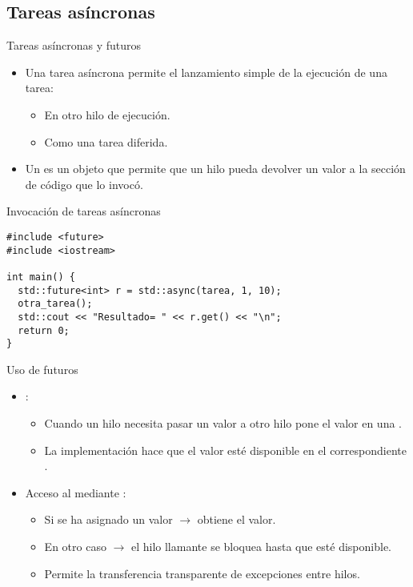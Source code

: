 \subsection{Tareas asíncronas}

\begin{frame}[t]{Tareas asíncronas y futuros}
\begin{itemize}
  \item Una tarea asíncrona permite el lanzamiento simple de la ejecución de una tarea:
    \begin{itemize}
      \item En otro hilo de ejecución.
      \item Como una tarea diferida.
    \end{itemize}

  \item Un  es un objeto que permite que un hilo pueda devolver un valor a la 
    sección de código que lo invocó.
\end{itemize}
\end{frame}

\begin{frame}[t,fragile]
\begin{block}{Invocación de tareas asíncronas}
\begin{lstlisting}
#include <future>
#include <iostream>

int main() {
  std::future<int> r = std::async(tarea, 1, 10);
  otra_tarea();
  std::cout << "Resultado= " << r.get() << "\n";
  return 0;
}
\end{lstlisting}
\end{block}
\end{frame}

\begin{frame}[t]{Uso de futuros}
\begin{itemize}
  \item {}:
    \begin{itemize}
      \item Cuando un hilo necesita pasar un valor a otro hilo pone el valor en una .
      \item La implementación hace que el valor esté disponible en el correspondiente .
    \end{itemize}

  \item Acceso al  mediante :
    \begin{itemize}
      \item Si se ha asignado un valor $\rightarrow$ obtiene el valor.
      \item En otro caso $\rightarrow$ el hilo llamante se bloquea hasta que esté disponible.
      \item Permite la transferencia transparente de excepciones entre hilos.
    \end{itemize}
\end{itemize}
\end{frame}
